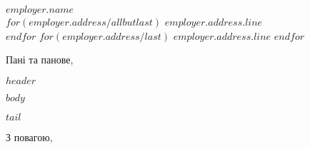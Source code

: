 \documentclass[$output.font_size$,$output.paper_size$]{letter}
\begin{document}
 
\begin{letter}{$employer.name$ \\ $for(employer.address/allbutlast)$ $employer.address.line$ \\ $endfor$ $for(employer.address/last)$ $employer.address.line$ $endfor$} 
\opening{Пані та панове,} 

\indent $header$

\indent $body$

\indent $tail$

\closing{З повагою,\\
 \\
}
 
\end{letter} 
\end{document}
